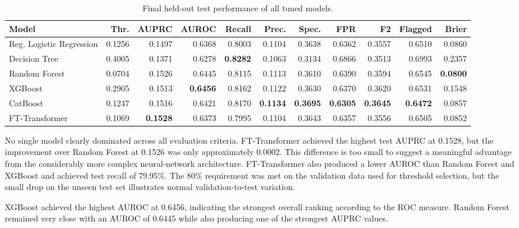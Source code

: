 \documentclass[11pt,a4paper]{article}
\begin{document}
\begin{table}[htbp]
\centering
\caption{Final held-out test performance of all tuned models.}
\label{tab:test_results}
\begin{adjustbox}{max width=\textwidth}
\begin{tabular}{lrrrrrrrrrr}
\toprule
Model & Thr. & AUPRC & AUROC & Recall & Prec. & Spec. & FPR & F2 & Flagged & Brier \\
\midrule
Reg. Logistic Regression & 0.1256 & 0.1497 & 0.6368 & 0.8003 & 0.1104 & 0.3638 & 0.6362 & 0.3557 & 0.6510 & 0.0860 \\
Decision Tree             & 0.4005 & 0.1371 & 0.6278 & \textbf{0.8282} & 0.1063 & 0.3134 & 0.6866 & 0.3513 & 0.6993 & 0.2357 \\
Random Forest             & 0.0704 & 0.1526 & 0.6445 & 0.8115 & 0.1113 & 0.3610 & 0.6390 & 0.3594 & 0.6545 & \textbf{0.0800} \\
XGBoost                   & 0.2905 & 0.1513 & \textbf{0.6456} & 0.8162 & 0.1122 & 0.3630 & 0.6370 & 0.3620 & 0.6531 & 0.1548 \\
CatBoost                  & 0.1247 & 0.1516 & 0.6421 & 0.8170 & \textbf{0.1134} & \textbf{0.3695} & \textbf{0.6305} & \textbf{0.3645} & \textbf{0.6472} & 0.0857 \\
FT-Transformer            & 0.1069 & \textbf{0.1528} & 0.6373 & 0.7995 & 0.1104 & 0.3643 & 0.6357 & 0.3556 & 0.6505 & 0.0852 \\
\bottomrule
\end{tabular}
\end{adjustbox}
\end{table}

No single model clearly dominated across all evaluation criteria. FT-Transformer achieved the highest test AUPRC at 0.1528, but the improvement over Random Forest at 0.1526 was only approximately 0.0002. This difference is too small to suggest a meaningful advantage from the considerably more complex neural-network architecture. FT-Transformer also produced a lower AUROC than Random Forest and XGBoost and achieved test recall of 79.95\%. The 80\% requirement was met on the validation data used for threshold selection, but the small drop on the unseen test set illustrates normal validation-to-test variation.

XGBoost achieved the highest AUROC at 0.6456, indicating the strongest overall ranking according to the ROC measure. Random Forest remained very close with an AUROC of 0.6445 while also producing one of the strongest AUPRC values.
\end{document}
